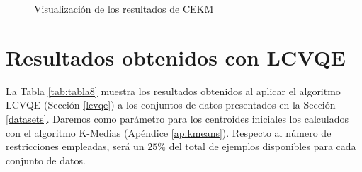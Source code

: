\begin{figure}[bth]
	\myfloatalign
	\caption{Visualización de los resultados de \acs{CEKM}}\label{fig:figure25}
\end{figure}

\clearpage

\section{Resultados obtenidos con LCVQE}

La Tabla \ref{tab:tabla8} muestra los resultados obtenidos al aplicar el algoritmo \acf{LCVQE} (Sección \ref{lcvqe}) a los conjuntos de datos presentados en la Sección \ref{datasets}. Daremos como parámetro para los centroides iniciales los calculados con el algoritmo K-Medias (Apéndice \ref{ap:kmeans}). Respecto al número de restricciones empleadas, será un $25\%$ del total de ejemplos disponibles para cada conjunto de datos.

